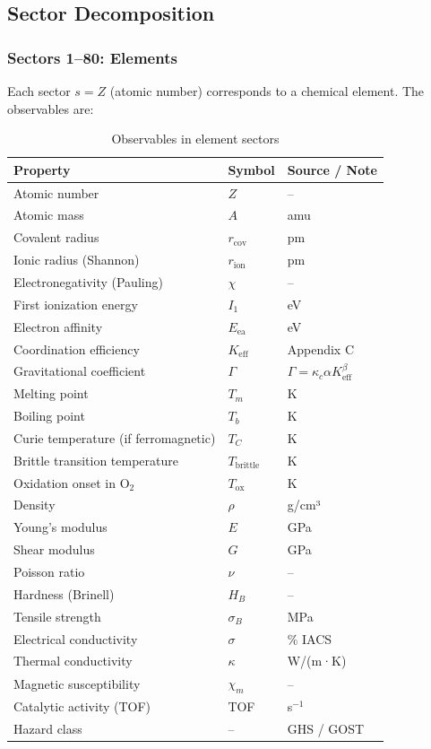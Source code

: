 \documentclass[12pt,a4paper]{article}
\newcommand{\Keff}{K_{\mathrm{eff}}}
\newcommand{\Gcoeff}{\Gamma}
\begin{document}
	\subsection{Sector Decomposition}
	
	\subsubsection{Sectors 1–80: Elements}
	
	Each sector \(s = Z\) (atomic number) corresponds to a chemical element. The observables are:
	
	\begin{table}[htbp]
		\centering
		\caption{Observables in element sectors}
		\label{tab:elem-obs}
		\begin{tabular}{p{4cm}p{3cm}p{6cm}}
			\toprule
			\textbf{Property} & \textbf{Symbol} & \textbf{Source / Note} \\
			\midrule
			Atomic number & \(Z\) & – \\
			Atomic mass & \(A\) & amu \\
			Covalent radius & \(r_{\text{cov}}\) & pm \\
			Ionic radius (Shannon) & \(r_{\text{ion}}\) & pm \\
			Electronegativity (Pauling) & \(\chi\) & – \\
			First ionization energy & \(I_1\) & eV \\
			Electron affinity & \(E_{\text{ea}}\) & eV \\
			Coordination efficiency & \(\Keff\) & Appendix C \\
			Gravitational coefficient & \(\Gcoeff\) & \(\Gcoeff = \kappa_c \alpha \Keff^{\beta}\) \\
			Melting point & \(T_m\) & K \\
			Boiling point & \(T_b\) & K \\
			Curie temperature (if ferromagnetic) & \(T_C\) & K \\
			Brittle transition temperature & \(T_{\text{brittle}}\) & K \\
			Oxidation onset in O\(_2\) & \(T_{\text{ox}}\) & K \\
			Density & \(\rho\) & g/cm³ \\
			Young’s modulus & \(E\) & GPa \\
			Shear modulus & \(G\) & GPa \\
			Poisson ratio & \(\nu\) & – \\
			Hardness (Brinell) & \(H_B\) & – \\
			Tensile strength & \(\sigma_B\) & MPa \\
			Electrical conductivity & \(\sigma\) & \% IACS \\
			Thermal conductivity & \(\kappa\) & W/(m·K) \\
			Magnetic susceptibility & \(\chi_m\) & – \\
			Catalytic activity (TOF) & TOF & s$^{-1}$ \\
			Hazard class & – & GHS / GOST \\
			\bottomrule
		\end{tabular}
	\end{table}
	
\end{document}

